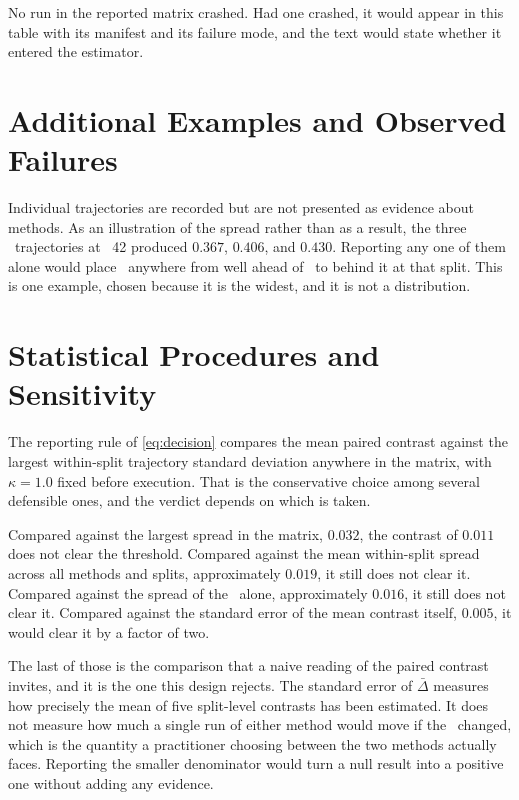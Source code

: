 No run in the reported matrix crashed. Had one crashed, it would appear in this
table with its manifest and its failure mode, and the text would state whether
it entered the estimator.

\section{Additional Examples and Observed Failures}
\label{sec:appendix-examples}

Individual trajectories are recorded but are not presented as evidence about
methods. As an illustration of the spread rather than as a result, the three
\methodrandom\ trajectories at \splitseed~42 produced $0.367$, $0.406$, and
$0.430$. Reporting any one of them alone would place \methodrandom\ anywhere from
well ahead of \methodmax\ to behind it at that split. This is one
example, chosen because it is the widest, and it is not a distribution.

\section{Statistical Procedures and Sensitivity}
\label{sec:appendix-statistics}

The reporting rule of \cref{eq:decision} compares the mean paired contrast
against the largest within-split trajectory standard deviation anywhere in the
matrix, with $\kappa = 1.0$ fixed before execution. That is the conservative
choice among several defensible ones, and the verdict depends on which is taken.

Compared against the largest spread in the matrix, $0.032$, the contrast of
$0.011$ does not clear the threshold. Compared against the mean within-split
spread across all methods and splits, approximately $0.019$, it still does not
clear it. Compared against the spread of the \methodcontrol\ alone,
approximately $0.016$, it still does not clear it. Compared against the standard
error of the mean contrast itself, $0.005$, it would clear it by a factor of two.

The last of those is the comparison that a naive reading of the paired contrast
invites, and it is the one this design rejects. The standard error of
$\bar{\Delta}$ measures how precisely the mean of five split-level contrasts has
been estimated. It does not measure how much a single run of either method would
move if the \trajseed\ changed, which is the quantity a practitioner choosing
between the two methods actually faces. Reporting the smaller denominator would
turn a null result into a positive one without adding any evidence.

